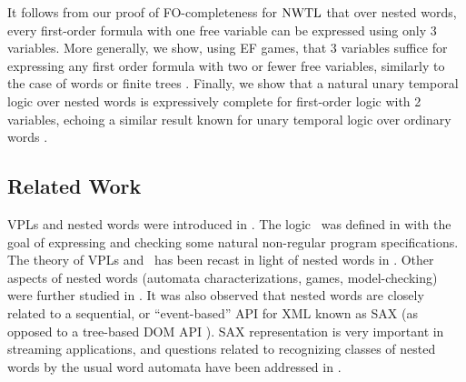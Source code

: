 \documentclass{LMCS}
\theoremstyle{plain}
\theoremstyle{definition}
\newcommand{\caret}{\text{CaRet}}
\begin{document}
It follows from our proof of FO-completeness for $\text{\rm NWTL}$ that over
nested words, every first-order formula with one free variable can be
expressed using only 3 variables.  More generally, we show, using EF
games, that 3 variables suffice for expressing any first order formula
with two or fewer free variables, similarly to the case of words
\cite{IK} or finite trees \cite{marx-tods}.  Finally, we show that a
natural unary temporal logic over nested words is expressively
complete for first-order logic with 2 variables, echoing a similar
result known for unary temporal logic over ordinary words
\cite{EVW02}.


\subsection*{Related Work}  

VPLs and nested words were introduced
in \cite{VPL,nested}. The logic \caret\ was defined in  \cite{AEM04} 
with the goal of expressing
and checking some natural non-regular program specifications.  The
theory of VPLs and \caret\ has been recast in light of nested words in 
\cite{nested}.
Other aspects of nested words (automata
characterizations, games, model-checking) were further studied in
\cite{RSM,nested,AEM04,LMS04}. It was also observed that nested
words are closely related to a sequential, or ``event-based'' API for
XML known as SAX \cite{sax} (as opposed to a tree-based DOM API
\cite{dom}). SAX representation is very important in streaming
applications, and questions related to recognizing classes of nested
words by the usual word automata have been addressed in
\cite{SV02,Baranystacs}. 
\end{document}
